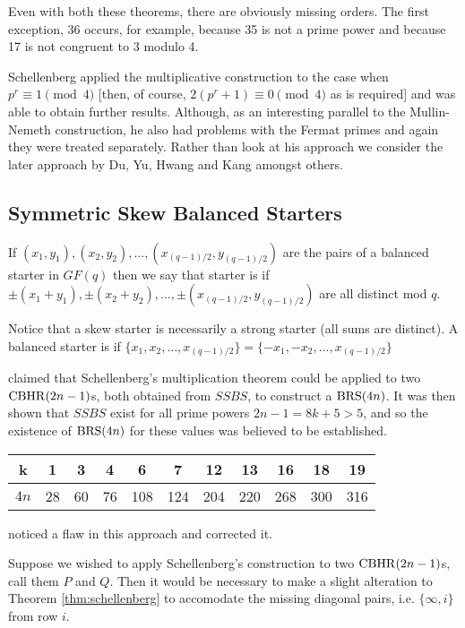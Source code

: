 Even with both these theorems, there are obviously missing orders.
The first exception, 36 occurs, for example, because 35 is not a prime power and because 17 is not congruent to 3 modulo 4.

Schellenberg applied the multiplicative construction to the case when $p^r \equiv 1\pmod 4$ [then, of course, $2(p^r + 1) \equiv 0\pmod 4$ as is required] and was able to obtain further results.
Although, as an interesting parallel to the Mullin-Nemeth construction, he also had problems with the Fermat primes and again they were treated separately.
Rather than look at his approach we consider the later approach by Du, Yu, Hwang and Kang amongst others.

\subsection{Symmetric Skew Balanced Starters}

If $(x_1, y_1), (x_2, y_2),\ldots, (x_{(q - 1)/2}, y_{(q - 1)/2})$ are the pairs of a balanced starter in $GF(q)$ then we say that starter is  if $\pm(x_1 + y_1), \pm(x_2 + y_2),\ldots, \pm(x_{(q - 1)/2}, y_{(q - 1)/2})$ are all distinct mod $q$.

Notice that a skew starter is necessarily a strong starter (all sums are distinct).
A balanced starter is  if $\{x_1, x_2,\ldots, x_{(q - 1)/2}\} = \{-x_1, -x_2,\ldots, x_{(q - 1)/2}\}$

\cite{hwangCompleteBalancedHowell1984} claimed that Schellenberg’s multiplication theorem could be applied to two $\operatorname{CBHR}(2n - 1)$s, both obtained from $SSBS$, to construct a $\operatorname{BRS}(4n)$.
It was then shown that $SSBS$ exist for all prime powers $2n - 1 = 8k + 5 > 5$, and so the existence of $\operatorname{BRS}(4n)$ for these values was believed to be established.

\begin{center}
\begin{tabular}{|c|c|c|c|c|c|c|c|c|c|c|}
\hline
  k  &  1 &  3 &  4 &   6 &   7 &  12 &  13 &  16 &  18 & 19 \\ \hline
$4n$ & 28 & 60 & 76 & 108 & 124 & 204 & 220 & 268 & 300 & 316 \\ \hline
\end{tabular}
\end{center}

\cite{andersonConstructionBalancedRoom1999} noticed a flaw in this approach and corrected it.

Suppose we wished to apply Schellenberg’s construction to two $\operatorname{CBHR}(2n - 1)$s, call them $P$ and $Q$.
Then it would be necessary to make a slight alteration to Theorem \ref{thm:schellenberg} to accomodate the missing diagonal pairs, i.e. $\{\infty, i\}$ from row $i$.

